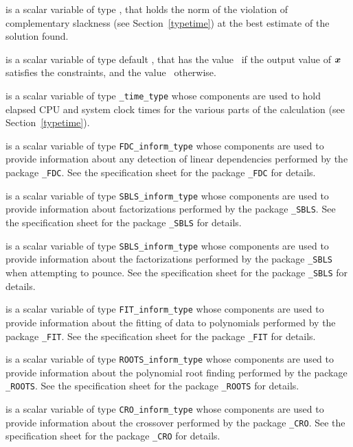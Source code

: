 \begin{description}
is a scalar variable of type \realdp,
that holds the norm of the violation of complementary slackness
(see Section~\ref{typetime}) at the best estimate of the solution found.

 is a scalar variable of type default \logical, that has the
value \true\ if the output value of ${\bm{x}}$ satisfies the constraints,
and the value \false\ otherwise.

 is a scalar variable of type {\tt \packagename\_time\_type}
whose components are used to hold elapsed CPU and system clock times for the
various parts of the calculation (see Section~\ref{typetime}).

 is a scalar variable of type
{\tt FDC\_inform\_type}
whose components are used to provide information about
any detection of linear dependencies
performed by the package
{\tt \libraryname\_FDC}.
See the specification sheet for the package
{\tt \libraryname\_FDC} for details.

 is a scalar variable of type
{\tt SBLS\_inform\_type}
whose components are used to provide information about factorizations
performed by the package
{\tt \libraryname\_SBLS}.
See the specification sheet for the package
{\tt \libraryname\_SBLS} for details.

 is a scalar variable of type
{\tt SBLS\_inform\_type}
whose components are used to provide information about the factorizations
performed by the package
{\tt \libraryname\_SBLS} when attempting to pounce.
See the specification sheet for the package
{\tt \libraryname\_SBLS} for details.

 is a scalar variable of type
{\tt FIT\_inform\_type}
whose components are used to provide information about the fitting
of data to polynomials performed by the package
{\tt \libraryname\_FIT}.
See the specification sheet for the package
{\tt \libraryname\_FIT} for details.

 is a scalar variable of type
{\tt ROOTS\_inform\_type}
whose components are used to provide information about the
polynomial root finding performed by the package
{\tt \libraryname\_ROOTS}.
See the specification sheet for the package
{\tt \libraryname\_ROOTS} for details.

 is a scalar variable of type
{\tt CRO\_inform\_type}
whose components are used to provide information about the crossover
performed by the package
{\tt \libraryname\_CRO}.
See the specification sheet for the package
{\tt \libraryname\_CRO} for details.

\end{description}
